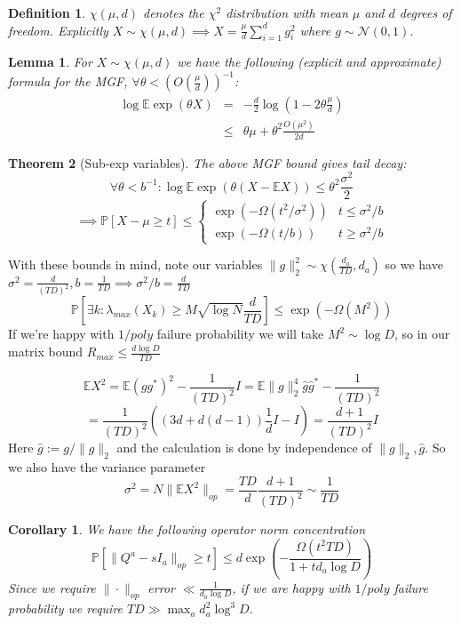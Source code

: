 \documentclass{article}
\newtheorem{theorem}{Theorem}
\newtheorem{corollary}{Corollary}
\newtheorem{lemma}[theorem]{Lemma}
\newtheorem{definition}{Definition}
\newcommand{\E}{\mathbb{E}}
\renewcommand{\Pr}{\mathbb{P}}
\begin{document}
\begin{definition}
$\chi(\mu,d)$ denotes the $\chi^{2}$ distribution with mean $\mu$ and $d$ degrees of freedom. Explicitly $X \sim \chi(\mu,d) \implies X = \frac{\mu}{d} \sum_{i=1}^{d} g_{i}^{2}$
where $g \sim \mathcal{N}(0,1)$. 
\end{definition}

\begin{lemma}
For $X \sim \chi(\mu,d)$ we have the following (explicit and approximate) formula for the MGF, $\forall \theta < \left(O(\frac{\mu}{d}) \right)^{-1}$:
\begin{eqnarray*} \log \E \exp(\theta X) & = & - \frac{d}{2} \log \left(1 - 2 \theta \frac{\mu}{d} \right) 
\\ & \leq & \theta \mu + \theta^{2} \frac{O(\mu^{2})}{2 d}
\end{eqnarray*}
\end{lemma}

\begin{theorem} [Sub-exp variables]
The above MGF bound gives tail decay:
\[ \forall \theta < b^{-1}: \log \E \exp(\theta (X - \E X)) \leq \theta^{2} \frac{\sigma^{2}}{2} \]
\[ \implies  \Pr[X - \mu \geq t] \leq \begin{cases}
\exp( - \Omega(t^{2}/\sigma^{2}) ) & t \leq \sigma^{2}/b
\\ \exp( - \Omega(t/b) ) & t \geq \sigma^{2}/b
\end{cases}   \]
\end{theorem}

With these bounds in mind, note our variables $\|g\|_{2}^{2} \sim \chi(\frac{d_{a}}{TD},d_{a})$ so we have $\sigma^{2} = \frac{d}{(TD)^{2}}, b = \frac{1}{TD} \implies \sigma^{2}/b = \frac{d}{TD}$
\[ \Pr[ \exists k: \lambda_{max}(X_{k}) \geq M \sqrt{\log N}\frac{d}{TD} ] \leq \exp( - \Omega(M^{2}) )  \]
If we're happy with $1/poly$ failure probability we will take $M^{2} \sim \log D$, so in our matrix bound $R_{max} \leq \frac{d \log D}{TD}$

\[ \E X^{2} = \E (g g^{*})^{2} - \frac{1}{(TD)^{2}} I = \E \|g\|_{2}^{4} \hat{g} \hat{g}^{*} - \frac{1}{(TD)^{2}} \]
\[ = \frac{1}{(TD)^{2}} ( (3d + d(d-1)) \frac{1}{d} I - I ) = \frac{d+1}{(TD)^{2}} I   \]
Here $\hat{g} := g / \|g\|_{2}$ and the calculation is done by independence of $\|g\|_{2}, \hat{g}$. So we also have the variance parameter
\[ \sigma^{2} = N \|\E X^{2}\|_{op} = \frac{TD}{d} \frac{d+1}{(TD)^{2}} \sim \frac{1}{TD}  \]

\begin{corollary}
We have the following operator norm concentration
\[ \Pr[ \|Q^{a} - sI_{a}\|_{op} \geq t ] \leq d \exp \left( - \frac{\Omega(t^{2} TD)}{1 + t d_{a} \log D }  \right)  \]
Since we require $\|\cdot\|_{op}$ error $\ll \frac{1}{d_{a} \log D}$, if we are happy with $1/poly$ failure probability we require $TD \gg \max_{a} d_{a}^{2} \log^{3} D$. 
\end{corollary}
\end{document}
